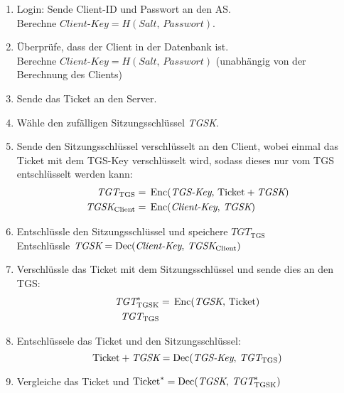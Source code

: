             \begin{enumerate}
            	\item Login: Sende Client-ID und Passwort an den AS. \\ Berechne \( \textit{Client-Key} = H(\textit{Salt},\, \textit{Passwort}) \).
            	\item Überprüfe, dass der Client in der Datenbank ist. \\ Berechne \( \textit{Client-Key} = H(\textit{Salt},\, \textit{Passwort}) \) (unabhängig von der Berechnung des Clients)
            	\item Sende das Ticket an den Server.
            	\item Wähle den zufälligen Sitzungsschlüssel \textit{TGSK}.
            	\item Sende den Sitzungsschlüssel verschlüsselt an den Client, wobei einmal das Ticket mit dem TGS-Key verschlüsselt wird, sodass dieses nur vom TGS entschlüsselt werden kann:
	            	\begin{align*}
	            		\textit{TGT}_\textrm{TGS}     & =\, \operatorname{Enc}(\textit{TGS-Key},\, \textrm{Ticket}+\textit{TGSK}) \\
	            		\textit{TGSK}_\textrm{Client} & =\, \operatorname{Enc}(\textit{Client-Key},\, \textit{TGSK})
	            	\end{align*}
	            \item Entschlüssle den Sitzungsschlüssel und speichere \( \textit{TGT}_\textrm{TGS} \) \\ Entschlüssle \( \textit{TGSK} = \operatorname{Dec}(\textit{Client-Key},\, \textit{TGSK}_\textrm{Client}) \)
	            \item Verschlüssle das Ticket mit dem Sitzungsschlüssel und sende dies an den TGS:
		            \begin{align*}
		            	\textit{TGT}^*_\textrm{TGSK} & =\, \operatorname{Enc}(\textit{TGSK},\, \textrm{Ticket}) \\
		            	\textit{TGT}_\textrm{TGS}    &
		            \end{align*}
		        \item Entschlüssele das Ticket und den Sitzungsschlüssel:
			        \begin{equation*}
				        \textrm{Ticket}+\textit{TGSK} = \operatorname{Dec}(\textit{TGS-Key},\, \textit{TGT}_\textrm{TGS})
			        \end{equation*}
			    \item Vergleiche das Ticket und \( \textrm{Ticket}^* = \operatorname{Dec}(\textit{TGSK},\, \textit{TGT}^*_\textrm{TGSK}) \)

\end{enumerate}

